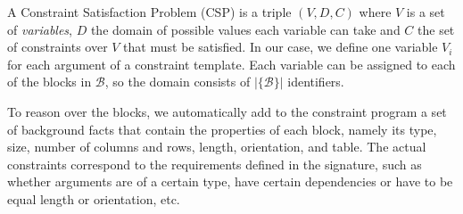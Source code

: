 \documentclass{IEEEtran}
\newcommand{\tias}[1]{\textcolor{blue}{{\sc Tias:} #1}\xspace}
\newcommand{\format}[1]{\textit{#1}\xspace}
\newcommand{\template}{\format{constraint template}}
\newcommand{\CSignature}{Signature\xspace}
\newcommand{\groups}{\ensuremath{\mathcal{B}}\xspace}
\newcommand{\blocks}{\ensuremath{\mathcal{B}}\xspace}
\theoremstyle{definition}
\begin{document}
A Constraint Satisfaction Problem (CSP) is a triple $(V,D,C)$ where $V$ is a set of \textit{variables}, $D$ the domain of possible values each variable can take and $C$ the set of constraints over $V$ that must be satisfied.
In our case, we define one variable $V_i$ for each argument of a constraint template.
Each variable can be assigned to each of the blocks in \blocks, so the domain consists of $|\{\blocks\}|$ identifiers.


To reason over the blocks, we automatically add to the constraint program a set of background facts that contain the properties of each block, namely its type, size, number of columns and rows, length, orientation, and table.
The actual constraints correspond to the requirements defined in the signature, such as whether arguments are of a certain type, have certain dependencies or have to be equal length or orientation, etc.

\end{document}
